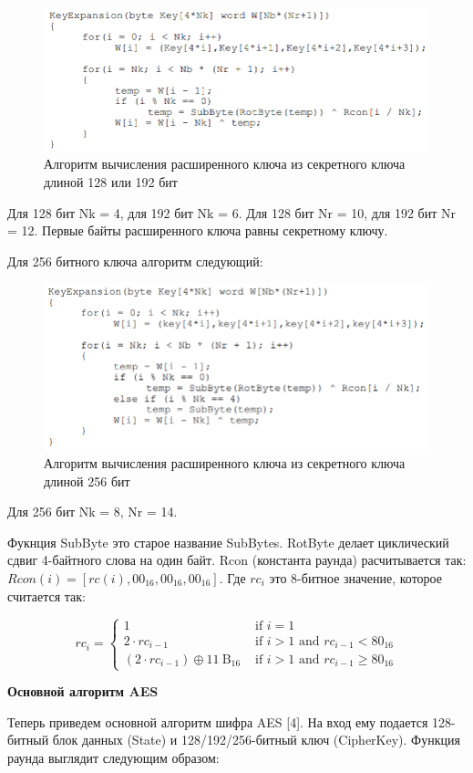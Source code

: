 \documentclass[colorthm]{./civarticle}
\begin{document}
\begin{figure}[H]
    \centering
    \includegraphics[width=0.5\linewidth]{key_shedule_1.png}
    \caption{Алгоритм вычисления расширенного ключа из секретного ключа длиной 128 или 192 бит}
    \label{fig:enter-label}
\end{figure}

Для 128 бит Nk = 4, для 192 бит Nk = 6. Для 128 бит Nr = 10, для 192 бит Nr = 12. Первые байты расширенного ключа равны секретному ключу.

Для 256 битного ключа алгоритм следующий:

\begin{figure}[H]
    \centering
    \includegraphics[width=0.5\linewidth]{key_shedule_2.png}
    \caption{Алгоритм вычисления расширенного ключа из секретного ключа длиной 256 бит}
    \label{fig:enter-label}
\end{figure}

Для 256 бит Nk = 8, Nr = 14.

Фукнция SubByte это старое название SubBytes. RotByte делает циклический сдвиг 4-байтного слова на один байт. Rcon (константа раунда) расчитывается так: $Rcon(i) = [rc(i), 00_{16}, 00_{16}, 00_{16}]$. Где $rc_i$  это 8-битное значение, которое считается так:

\begin{equation}
    rc_i= \begin{cases}1 & \text { if } i=1 \\ 2 \cdot r c_{i-1} & \text { if } i>1 \text { and } r c_{i-1}<80_{16} \\ \left(2 \cdot r c_{i-1}\right) \oplus 11 \mathrm{~B}_{16} & \text { if } i>1 \text { and } r c_{i-1} \geq 80_{16}\end{cases}
\end{equation}

\textbf{Основной алгоритм AES}

Теперь приведем основной алгоритм шифра AES [4]. На вход ему подается 128-битный блок данных (State) и 128/192/256-битный ключ (CipherKey). Функция раунда выглядит следующим образом:
\end{document}
